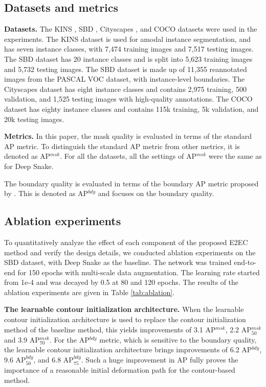 \documentclass[10pt,twocolumn,letterpaper]{article}
\begin{document}
 \subsection{Datasets and metrics}
\textbf{Datasets.} The KINS \cite{kins}, SBD \cite{sbd}, Cityscapes \cite{cityscapes}, and COCO \cite{coco} datasets were used in the experiments. The KINS dataset is used for amodal instance segmentation, and has seven instance classes, with 7,474 training images and 7,517 testing images. The SBD dataset has 20 instance classes and is split into 5,623 training images and 5,732 testing images. The SBD dataset is made up of 11,355 reannotated images from the PASCAL VOC \cite{voc} dataset, with instance-level boundaries. The Cityscapes dataset has eight instance classes and contains 2,975 training, 500 validation, and 1,525 testing images with high-quality annotations. The COCO dataset has eighty instance classes and contains 115k training, 5k validation, and 20k testing images. 

\textbf{Metrics.} In this paper, the mask quality is evaluated in terms of the standard AP metric. To distinguish the standard AP metric from other metrics, it is denoted as AP$^{msk}$. For all the datasets, all the settings of AP$^{msk}$ were the same as for Deep Snake.
 
The boundary quality is evaluated in terms of the boundary AP metric proposed by \cite{boundaryiou}. This is denoted as AP$^{bdy}$ and focuses on the boundary quality.

\subsection{Ablation experiments}
To quantitatively analyze the effect of each component of the proposed E2EC method and verify the design details, we conducted ablation experiments on the SBD dataset, with Deep Snake as the baseline. The network was trained end-to-end for 150 epochs with multi-scale data augmentation. The learning rate started from 1e-4 and was decayed by 0.5 at 80 and 120 epochs. The results of the ablation experiments are given in Table \ref{tab:ablation}.

\textbf{The learnable contour initialization architecture.} When the learnable contour initialization architecture is used to replace the contour initialization method of the baseline method, this yields improvements of 3.1 AP$^{msk}$, 2.2 AP$_{50}^{msk}$ and 3.9 AP$_{70}^{msk}$. For the AP$^{bdy}$ metric, which is sensitive to the boundary quality, the learnable contour initialization architecture brings improvements of 6.2 AP$^{bdy}$, 9.6 AP$_{50}^{bdy}$, and 6.8 AP$_{75}^{bdy}$. Such a huge improvement in AP fully proves the importance of a reasonable initial deformation path for the contour-based method.
\end{document}
